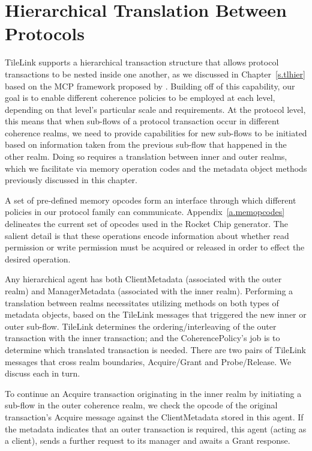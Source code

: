 \section{Hierarchical Translation Between Protocols}

TileLink supports a hierarchical transaction structure that allows protocol transactions
to be nested inside one another, as we discussed in Chapter~\ref{s.tlhier}
based on the MCP framework proposed by \cite{beu2011manager}.
Building off of this capability, our goal is to enable different coherence policies to be employed at each level,
depending on that level's particular scale and requirements.
At the protocol level, this means that when sub-flows of a protocol transaction
occur in different coherence realms, we need to provide capabilities for
new sub-flows to be initiated based on information taken from the previous sub-flow
that happened in the other realm.
Doing so requires a translation between inner and outer realms,
which we facilitate via memory operation codes and the
metadata object methods previously discussed in this chapter.

A set of pre-defined memory opcodes
form an interface through which different policies in our protocol family can communicate.
Appendix~\ref{a.memopcodes} delineates the current set of opcodes used in the Rocket Chip generator.
The salient detail is that these operations encode information about whether read permission or write permission
must be acquired or released in order to effect the desired operation.

Any hierarchical agent has both ClientMetadata (associated with the outer realm)
and ManagerMetadata (associated with the inner realm).
Performing a translation between realms necessitates utilizing methods on both types of metadata objects,
based on the TileLink messages that triggered the new inner or outer sub-flow.
TileLink determines the ordering/interleaving of the outer transaction with the inner transaction;
and the CoherencePolicy's job is to determine which translated transaction is needed.
There are two pairs of TileLink messages that cross realm boundaries,
Acquire/Grant and Probe/Release.
We discuss each in turn.

To continue an Acquire transaction originating in the inner realm
by initiating a sub-flow in the outer coherence realm, we check the opcode
of the original transaction's Acquire message against the ClientMetadata stored in this agent.
If the metadata indicates that an outer transaction is required, this agent (acting as a client),
sends a further request to its manager and awaits a Grant response.

